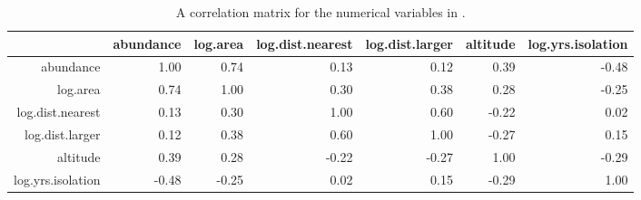 \begin{table}[ht]
	\footnotesize
	\centering
	\begin{tabular}{rrrrrrr}
		\hline
		& abundance & log.area & log.dist.nearest & log.dist.larger & altitude & log.yrs.isolation \\ 
		\hline
		abundance & 1.00 & 0.74 & 0.13 & 0.12 & 0.39 & -0.48 \\ 
		log.area & 0.74 & 1.00 & 0.30 & 0.38 & 0.28 & -0.25 \\ 
		log.dist.nearest & 0.13 & 0.30 & 1.00 & 0.60 & -0.22 & 0.02 \\ 
		log.dist.larger & 0.12 & 0.38 & 0.60 & 1.00 & -0.27 & 0.15 \\ 
		altitude & 0.39 & 0.28 & -0.22 & -0.27 & 1.00 & -0.29 \\ 
		log.yrs.isolation & -0.48 & -0.25 & 0.02 & 0.15 & -0.29 & 1.00 \\ 
		\hline
	\end{tabular}
\caption{A correlation matrix for the numerical variables in .}
\label{forestbirdsCorrelation}
\end{table}


